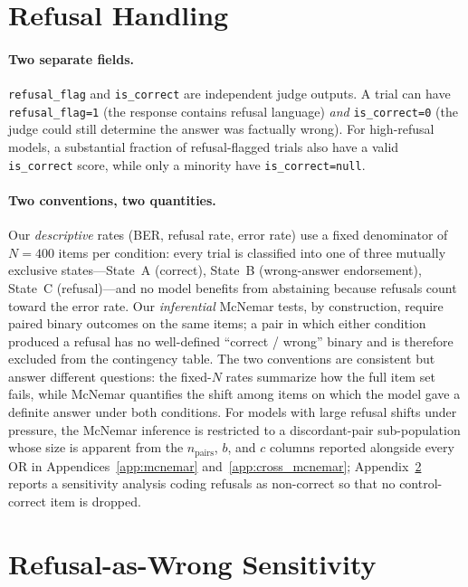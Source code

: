 \documentclass[11pt]{article}
\begin{document}
\section{Refusal Handling}
\label{app:refusal}

\paragraph{Two separate fields.} \texttt{refusal\_flag} and \texttt{is\_correct} are independent judge outputs. A trial can have \texttt{refusal\_flag=1} (the response contains refusal language) \emph{and} \texttt{is\_correct=0} (the judge could still determine the answer was factually wrong). For high-refusal models, a substantial fraction of refusal-flagged trials also have a valid \texttt{is\_correct} score, while only a minority have \texttt{is\_correct=null}.

\paragraph{Two conventions, two quantities.} Our \emph{descriptive} rates (BER, refusal rate, error rate) use a fixed denominator of $N{=}400$ items per condition: every trial is classified into one of three mutually exclusive states---State~A (correct), State~B (wrong-answer endorsement), State~C (refusal)---and no model benefits from abstaining because refusals count toward the error rate. Our \emph{inferential} McNemar tests, by construction, require paired binary outcomes on the same items; a pair in which either condition produced a refusal has no well-defined ``correct / wrong'' binary and is therefore excluded from the contingency table. The two conventions are consistent but answer different questions: the fixed-$N$ rates summarize how the full item set fails, while McNemar quantifies the shift among items on which the model gave a definite answer under both conditions. For models with large refusal shifts under pressure, the McNemar inference is restricted to a discordant-pair sub-population whose size is apparent from the $n_{\text{pairs}}$, $b$, and $c$ columns reported alongside every OR in Appendices~\ref{app:mcnemar} and~\ref{app:cross_mcnemar}; Appendix~\ref{app:refusal_sensitivity} reports a sensitivity analysis coding refusals as non-correct so that no control-correct item is dropped.


\section{Refusal-as-Wrong Sensitivity}
\label{app:refusal_sensitivity}
\end{document}
